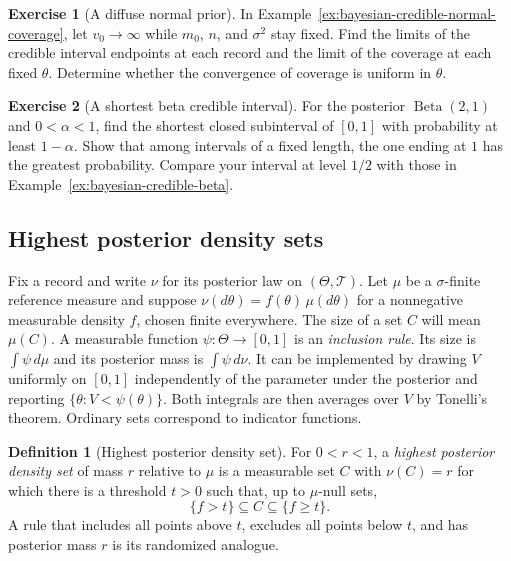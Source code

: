 \documentclass[11pt,oneside]{book}
\theoremstyle{definition}
\newtheorem{definition}[theorem]{Definition}
\newtheorem{exercise}{Exercise}[section]
\theoremstyle{remark}
\begin{document}
\begin{exercise}[A diffuse normal prior]
\label{exer:bayesian-credible-normal-diffuse}
In Example~\ref{ex:bayesian-credible-normal-coverage}, let
$v_0\to\infty$ while $m_0$, $n$, and $\sigma^2$ stay fixed.
Find the limits of the credible interval endpoints at each
record and the limit of the coverage at each fixed $\theta$.
Determine whether the convergence of coverage is uniform in $\theta$.
\end{exercise}

\begin{exercise}[A shortest beta credible interval]
\label{exer:bayesian-credible-beta-shortest}
For the posterior $\operatorname{Beta}(2,1)$ and $0<\alpha<1$,
find the shortest closed subinterval of $[0,1]$ with probability
at least $1-\alpha$. Show that among intervals of a fixed
length, the one ending at $1$ has the greatest probability.
Compare your interval at level $1/2$ with those in
Example~\ref{ex:bayesian-credible-beta}.
\end{exercise}

\subsection{Highest posterior density sets}
\label{subsec:bayesian-highest-posterior-density}

Fix a record and write $\nu$ for its posterior law on
$(\Theta,\mathcal T)$. Let $\mu$ be a $\sigma$-finite reference measure
and suppose $\nu(d\theta)=f(\theta)\,\mu(d\theta)$ for a nonnegative
measurable density $f$, chosen finite everywhere. The size of a set $C$ will mean $\mu(C)$.
A measurable function $\psi:\Theta\to[0,1]$ is an \emph{inclusion rule}. Its size is $\int\psi\,d\mu$ and its
posterior mass is $\int\psi\,d\nu$. It can be implemented by drawing
$V$ uniformly on $[0,1]$ independently of the parameter under the
posterior and reporting $\{\theta:V<\psi(\theta)\}$. Both integrals
are then averages over $V$ by Tonelli's theorem. Ordinary sets
correspond to indicator functions.

\begin{definition}[Highest posterior density set]
\label{def:bayesian-highest-density-set}
For $0<r<1$, a \emph{highest posterior density set} of mass $r$
relative to $\mu$ is a measurable set $C$ with $\nu(C)=r$ for which
there is a threshold $t>0$ such that, up to $\mu$-null sets,
\[
\{f>t\}\subseteq C\subseteq\{f\geq t\}.
\]
A rule that includes all points above $t$, excludes all points
below $t$, and has posterior mass $r$ is its randomized analogue.
\end{definition}
\end{document}
